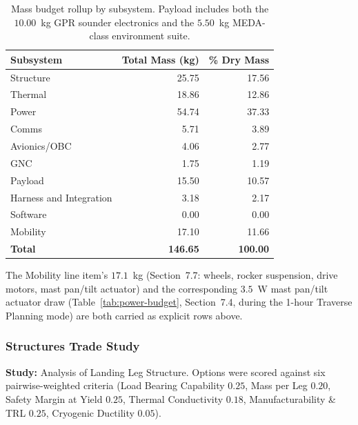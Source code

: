 \documentclass[11pt]{article}
\begin{document}
\begin{table}[H]
\centering
\small
\begin{tabular}{lrr}
\toprule
\textbf{Subsystem} & \textbf{Total Mass (kg)} & \textbf{\% Dry Mass} \\
\midrule
Structure & 25.75 & 17.56 \\
Thermal & 18.86 & 12.86 \\
Power & 54.74 & 37.33 \\
Comms & 5.71 & 3.89 \\
Avionics/OBC & 4.06 & 2.77 \\
GNC & 1.75 & 1.19 \\
Payload & 15.50 & 10.57 \\
Harness and Integration & 3.18 & 2.17 \\
Software & 0.00 & 0.00 \\
Mobility & 17.10 & 11.66 \\
\midrule
\textbf{Total} & \textbf{146.65} & \textbf{100.00} \\
\bottomrule
\end{tabular}
\caption{Mass budget rollup by subsystem. Payload includes both the $10.00$~kg GPR sounder
electronics and the $5.50$~kg MEDA-class environment suite.}
\label{tab:mass-rollup}
\end{table}

The Mobility line item's $17.1$~kg (Section~7.7: wheels, rocker suspension, drive motors, mast
pan/tilt actuator) and the corresponding $3.5$~W mast pan/tilt actuator draw (Table~\ref{tab:power-budget},
Section~7.4, during the 1-hour Traverse Planning mode) are both carried as explicit rows above.

\subsubsection{Structures Trade Study}
\textbf{Study:} Analysis of Landing Leg Structure. Options were scored against six
pairwise-weighted criteria (Load Bearing Capability $0.25$, Mass per Leg $0.20$, Safety Margin
at Yield $0.25$, Thermal Conductivity $0.18$, Manufacturability \& TRL $0.25$, Cryogenic
Ductility $0.05$).
\end{document}
